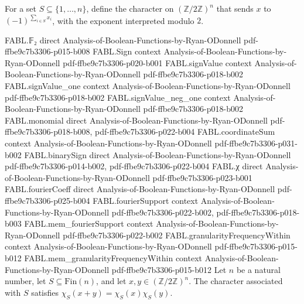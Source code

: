 \begin{definition}
\leanok
{}
For a set $S\subseteq\{1,\ldots,n\}$, define the character on
$(\mathbb{Z}/2\mathbb{Z})^n$ that sends $x$ to $(-1)^{\sum_{i\in S}x_i}$, with the
exponent interpreted modulo $2$.
\end{definition}

\begin{theorem}
\leanok
{}
\proofstep
  {FABL.𝔽₂}
  {direct}
  {Analysis-of-Boolean-Functions-by-Ryan-ODonnell}
  {pdf-ffbe9c7b3306-p015-b008}
\proofstep
  {FABL.Sign}
  {context}
  {Analysis-of-Boolean-Functions-by-Ryan-ODonnell}
  {pdf-ffbe9c7b3306-p020-b001}
\proofstep
  {FABL.signValue}
  {context}
  {Analysis-of-Boolean-Functions-by-Ryan-ODonnell}
  {pdf-ffbe9c7b3306-p018-b002}
\proofstep
  {FABL.signValue_one}
  {context}
  {Analysis-of-Boolean-Functions-by-Ryan-ODonnell}
  {pdf-ffbe9c7b3306-p018-b002}
\proofstep
  {FABL.signValue_neg_one}
  {context}
  {Analysis-of-Boolean-Functions-by-Ryan-ODonnell}
  {pdf-ffbe9c7b3306-p018-b002}
\proofstep
  {FABL.monomial}
  {direct}
  {Analysis-of-Boolean-Functions-by-Ryan-ODonnell}
  {pdf-ffbe9c7b3306-p018-b008,
    pdf-ffbe9c7b3306-p022-b004}
\proofstep
  {FABL.coordinateSum}
  {context}
  {Analysis-of-Boolean-Functions-by-Ryan-ODonnell}
  {pdf-ffbe9c7b3306-p031-b002}
\proofstep
  {FABL.binarySign}
  {direct}
  {Analysis-of-Boolean-Functions-by-Ryan-ODonnell}
  {pdf-ffbe9c7b3306-p014-b002,
    pdf-ffbe9c7b3306-p022-b004}
\proofstep
  {FABL.χ}
  {direct}
  {Analysis-of-Boolean-Functions-by-Ryan-ODonnell}
  {pdf-ffbe9c7b3306-p023-b001}
\proofstep
  {FABL.fourierCoeff}
  {direct}
  {Analysis-of-Boolean-Functions-by-Ryan-ODonnell}
  {pdf-ffbe9c7b3306-p025-b004}
\proofstep
  {FABL.fourierSupport}
  {context}
  {Analysis-of-Boolean-Functions-by-Ryan-ODonnell}
  {pdf-ffbe9c7b3306-p022-b002,
    pdf-ffbe9c7b3306-p018-b003}
\proofstep
  {FABL.mem_fourierSupport}
  {context}
  {Analysis-of-Boolean-Functions-by-Ryan-ODonnell}
  {pdf-ffbe9c7b3306-p022-b002}
\proofstep
  {FABL.granularityFrequencyWithin}
  {context}
  {Analysis-of-Boolean-Functions-by-Ryan-ODonnell}
  {pdf-ffbe9c7b3306-p015-b012}
\proofstep
  {FABL.mem_granularityFrequencyWithin}
  {context}
  {Analysis-of-Boolean-Functions-by-Ryan-ODonnell}
  {pdf-ffbe9c7b3306-p015-b012}
Let $n$ be a natural number, let $S\subseteq\mathrm{Fin}(n)$, and let $x,y\in(\mathbb
Z/2\mathbb Z)^n$. The character associated with $S$ satisfies
$\chi_S(x+y)=\chi_S(x)\chi_S(y)$.
\end{theorem}


